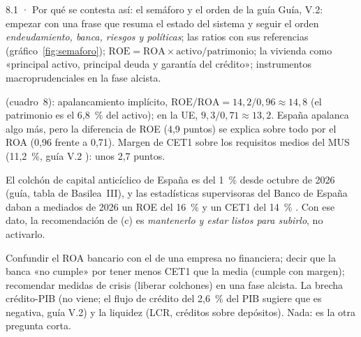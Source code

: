 \begin{complemento}{8.1 · Por qué se contesta así: el semáforo y el orden de la guía}
 Guía, V.2: empezar con una frase que resuma el estado del sistema y seguir el orden \emph{endeudamiento, banca, riesgos y políticas}; las ratios con sus referencias (gráfico~\ref{fig:semaforo}); $\mathrm{ROE}=\mathrm{ROA}\times\text{activo}/\text{patrimonio}$; la vivienda como «principal activo, principal deuda y garantía del crédito»; instrumentos macroprudenciales en la fase alcista.

\begin{figuracaja}
\caption{Semáforo de la banca: referencias de las ratios principales (infografía de la guía)}\label{fig:semaforo}
\end{figuracaja}

 (cuadro~8): apalancamiento implícito, $\mathrm{ROE}/\mathrm{ROA}=14{,}2/0{,}96\approx14{,}8$ (el patrimonio es el 6,8~\% del activo); en la UE, $9{,}3/0{,}71\approx13{,}2$. España apalanca algo más, pero la diferencia de ROE (4,9 puntos) se explica sobre todo por el ROA (0,96 frente a 0,71). Margen de CET1 sobre los requisitos medios del MUS (11,2~\%, guía V.2 \parencite{BCE2025SREP}): unos 2,7 puntos.

 El colchón de capital anticíclico de España es del 1~\% desde octubre de 2026 \parencite{BdE2025CCA} (guía, tabla de Basilea~III), y las estadísticas supervisoras del Banco de España daban a mediados de 2026 un ROE del 16~\% y un CET1 del 14~\% \parencite{BdE2026EstadSupervisoras}. Con ese dato, la recomendación de (c) es \emph{mantenerlo y estar listos para subirlo}, no activarlo.

 Confundir el ROA bancario con el de una empresa no financiera; decir que la banca «no cumple» por tener menos CET1 que la media (cumple con margen); recomendar medidas de crisis (liberar colchones) en una fase alcista.  La brecha crédito-PIB (no viene; el flujo de crédito del 2,6~\% del PIB sugiere que es negativa, guía V.2) y la liquidez (LCR, créditos sobre depósitos).  Nada: es la otra pregunta corta.
\end{complemento}
